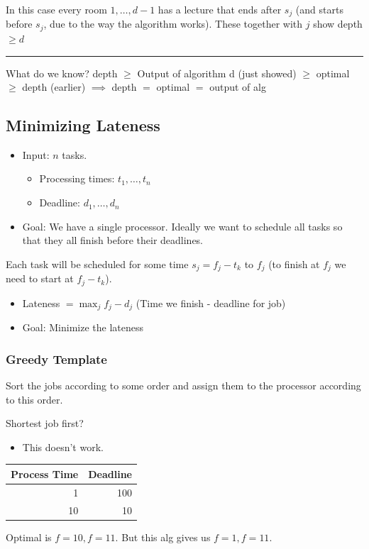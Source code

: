 \documentclass[11pt]{article}
\begin{document}
\begin{enumerate}
\begin{center}
\end{center}
In this case every room \(1,\ldots,d-1\) has a lecture that ends after \(s_j\) (and starts before \(s_j\), due to the way the algorithm works). These together with \(j\) show depth \(\geq d\)

\noindent\rule{\textwidth}{0.5pt}
What do we know? depth \(\geq\) Output of algorithm d (just showed) \(\geq\) optimal \(\geq\) depth (earlier) \(\implies\) depth \(=\) optimal \(=\) output of alg
\end{enumerate}
\subsection{Minimizing Lateness}
\label{sec:org32e35eb}
\begin{itemize}
\item Input: \(n\) tasks.
\begin{itemize}
\item Processing times: \(t_1, \ldots, t_n\)
\item Deadline: \(d_1,\ldots,d_n\)
\end{itemize}
\item Goal: We have a single processor. Ideally we want to schedule all tasks so that they all finish before their deadlines.
\end{itemize}
Each task will be scheduled for some time \(s_j = f_j-t_k\) to \(f_j\) (to finish at \(f_j\) we need to start at \(f_j-t_k\)).
\begin{itemize}
\item Lateness \(= \max_j{f_j - d_j}\) (Time we finish - deadline for job)
\item Goal: Minimize the lateness
\end{itemize}
\subsubsection{Greedy Template}
\label{sec:orgf31f20e}
Sort the jobs according to some order and assign them to the processor according to this order.

Shortest job first?
\begin{itemize}
\item This doesn't work.
\end{itemize}
\begin{center}
\begin{tabular}{rr}
Process Time & Deadline\\
\hline
1 & 100\\
10 & 10\\
\end{tabular}
\end{center}
Optimal is \(f=10, f=11\). But this alg gives us \(f=1, f=11\). 
\end{document}
